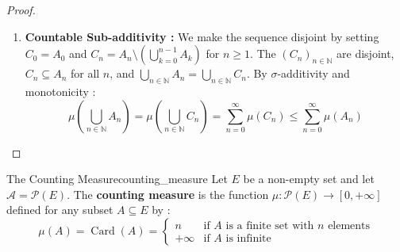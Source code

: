 \begin{proof}
\begin{enumerate}
    \item \textbf{Countable Sub-additivity :}
    We make the sequence disjoint by setting $C_0 = A_0$ and $C_n = A_n \setminus \left( \bigcup_{k=0}^{n-1} A_k \right)$ for $n \ge 1$.
    The $(C_n)_{n \in \mathbb{N}}$ are disjoint, $C_n \subseteq A_n$ for all $n$, and $\bigcup_{n \in \mathbb{N}} A_n = \bigcup_{n \in \mathbb{N}} C_n$.
    By $\sigma$-additivity and monotonicity :
    \[
        \mu\left( \bigcup_{n \in \mathbb{N}} A_n \right) = \mu\left( \bigcup_{n \in \mathbb{N}} C_n \right) = \sum_{n=0}^\infty \mu(C_n) \le \sum_{n=0}^\infty \mu(A_n)
    \]
\end{enumerate}
\end{proof}


\begin{example}{The Counting Measure}{counting_measure}
Let $E$ be a non-empty set and let $\mathcal{A} = \mathcal{P}(E)$. The \textbf{counting measure} is the function \newline $\mu : \mathcal{P}(E) \to [0, +\infty]$ defined for any subset $A \subseteq E$ by :
\[
    \mu(A) = \operatorname{Card}(A) = 
    \begin{cases}
        n & \text{if } A \text{ is a finite set with } n \text{ elements} \\
        +\infty & \text{if } A \text{ is infinite}
    \end{cases}
\]
\end{example}

